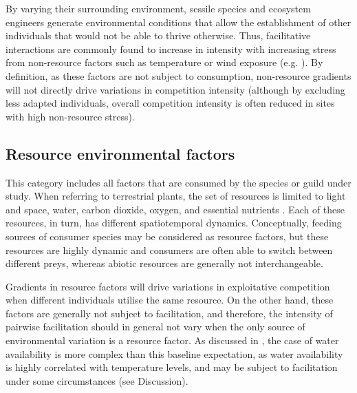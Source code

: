 By varying their surrounding environment, sessile species and ecosystem engineers generate environmental conditions that allow the establishment of other individuals that would not be able to thrive otherwise. Thus, facilitative interactions are commonly found to increase in intensity with increasing stress from non-resource factors such as temperature or wind exposure (e.g. \citealt{Fajardo2011}). By definition, as these factors are not subject to consumption, non-resource gradients will not directly drive variations in competition intensity (although by excluding less adapted individuals, overall competition intensity is often reduced in sites with high non-resource stress).

\subsection{Resource environmental factors}

This category includes all factors that are consumed by the species or guild under study. When referring to terrestrial plants, the set of resources is limited to light and space, water, carbon dioxide, oxygen, and essential nutrients \citep{Austin1990}. Each of these resources, in turn, has different spatiotemporal dynamics. Conceptually, feeding sources of consumer species may be considered as resource factors, but these resources are highly dynamic and consumers are often able to switch between different preys, whereas abiotic resources are generally not interchangeable.

Gradients in resource factors will drive variations in exploitative competition when different individuals utilise the same resource. On the other hand, these factors are generally not subject to facilitation, and therefore, the intensity of pairwise facilitation should in general not vary when the only source of environmental variation is a resource factor. As discussed in \cite{Maestre2009}, the case of water availability is more complex than this baseline expectation, as water availability is highly correlated with temperature levels, and may be subject to facilitation under some circumstances (see Discussion).

